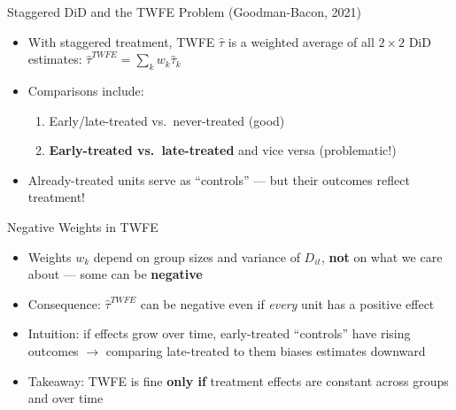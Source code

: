 \documentclass[10pt, handout]{beamer}
\begin{document}

\begin{frame}{Staggered DiD and the TWFE Problem (Goodman-Bacon, 2021)}
  \begin{itemize}
    \item With staggered treatment, TWFE $\hat{\tau}$ is a weighted average of all $2 \times 2$ DiD estimates:
      $\hat{\tau}^{TWFE} = \sum_{k} w_k \hat{\tau}_k$
    \item Comparisons include:
      \begin{enumerate}
        \item Early/late-treated vs.\ never-treated (good)
        \item \textbf{Early-treated vs.\ late-treated} and vice versa (problematic!)
      \end{enumerate}
    \item Already-treated units serve as ``controls'' --- but their outcomes reflect treatment!
  \end{itemize}
\end{frame}

\begin{frame}{Negative Weights in TWFE}
  \begin{itemize}
    \item Weights $w_k$ depend on group sizes and variance of $D_{it}$, \textbf{not} on what we care about --- some can be \textbf{negative}
    \item Consequence: $\hat{\tau}^{TWFE}$ can be negative even if \textit{every} unit has a positive effect
    \item Intuition: if effects grow over time, early-treated ``controls'' have rising outcomes $\to$ comparing late-treated to them biases estimates downward
    \item Takeaway: TWFE is fine \textbf{only if} treatment effects are constant across groups and over time
  \end{itemize}
\end{frame}

\end{document}

